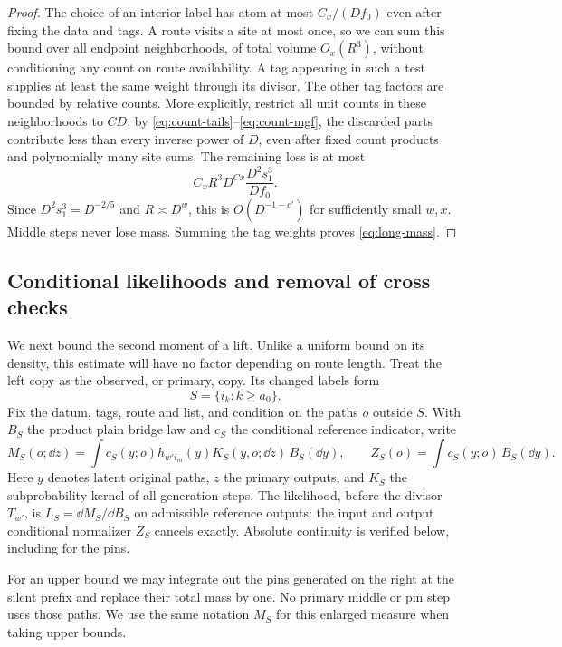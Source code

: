 \begin{proof}
The choice of an interior label has atom at most $C_x/(Df_0)$ even
after fixing the data and tags.  A route visits a site at most once,
so we can sum this bound over all endpoint neighborhoods, of total
volume $O_x(R^3)$, without conditioning any count on route
availability.  A tag appearing in such a test supplies at least the
same weight through its divisor.  The other tag factors are bounded
by relative counts.  More explicitly, restrict all unit counts in
these neighborhoods to $CD$; by
\eqref{eq:count-tails}--\eqref{eq:count-mgf}, the discarded parts
contribute less than every inverse power of $D$, even after fixed
count products and polynomially many site sums.  The remaining loss
is at most
\[
 C_xR^3D^{Cx}\frac{D^2s_1^3}{Df_0}.
\]
Since $D^2s_1^3=D^{-2/5}$ and $R\asymp D^w$, this is
$O(D^{-1-c'})$ for sufficiently small $w,x$.  Middle steps never
lose mass.  Summing the tag weights proves \eqref{eq:long-mass}.
\end{proof}

\subsection{Conditional likelihoods and removal of cross checks}

We next bound the second moment of a lift.  Unlike a uniform bound
on its density, this estimate will have no factor depending on route
length.  Treat the left copy as the observed, or primary, copy.  Its
changed labels form
\[
 S=\{i_k:k\ge a_0\}.
\]
Fix the datum, tags, route and list, and condition on the paths $o$
outside $S$.  With $B_S$ the product plain bridge law and $c_S$ the
conditional reference indicator, write
\begin{equation}\label{eq:long-kernel}
 M_S(o;\dd z)=\int c_S(y;o)h_{w'i_m}(y)
                    K_S(y,o;\dd z)\,B_S(\dd y),\qquad
 Z_S(o)=\int c_S(y;o)\,B_S(\dd y).
\end{equation}
Here $y$ denotes latent original paths, $z$ the primary outputs,
and $K_S$ the subprobability kernel of all generation steps.  The
likelihood, before the divisor $T_{w'}$, is
$L_S=\dd M_S/\dd B_S$ on admissible reference outputs: the input
and output conditional normalizer $Z_S$ cancels exactly.  Absolute
continuity is verified below, including for the pins.

For an upper bound we may integrate out the pins generated on the
right at the silent prefix and replace their total mass by one.
No primary middle or pin step uses those paths.  We use the same
notation $M_S$ for this enlarged measure when taking upper bounds.

